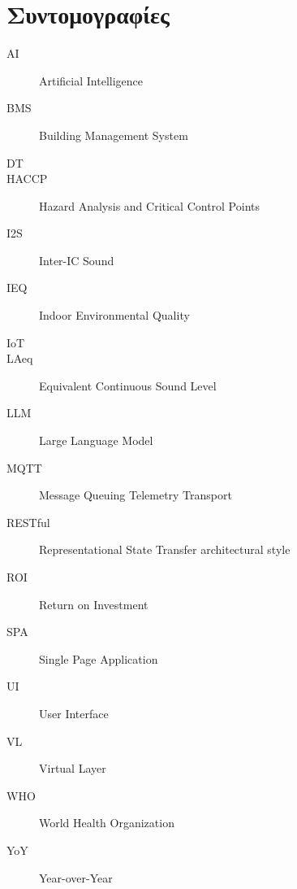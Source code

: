 \chapter*{Συντομογραφίες}

\begin{description}
  \item[AI] Artificial Intelligence
  \item[BMS] Building Management System
  \item[DT] 
  \item[HACCP] Hazard Analysis and Critical Control Points
  \item[I2S] Inter-IC Sound
  \item[IEQ] Indoor Environmental Quality
  \item[IoT] 
  \item[LAeq] Equivalent Continuous Sound Level
  \item[LLM] Large Language Model
  \item[MQTT] Message Queuing Telemetry Transport
  \item[RESTful] Representational State Transfer architectural style
  \item[ROI] Return on Investment
  \item[SPA] Single Page Application
  \item[UI] User Interface
  \item[VL] Virtual Layer
  \item[WHO] World Health Organization
  \item[YoY] Year-over-Year
\end{description}
